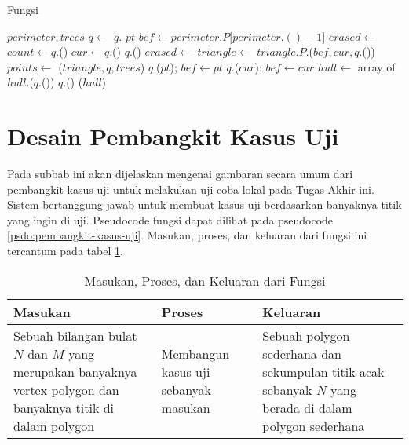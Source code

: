 \begin{algorithm}
    \caption{Fungsi }
	\label{psdo:fungsi-solve}
    \begin{algorithmic}[1]
        \Require $perimeter, trees$
        \State $q \leftarrow$ 
        \State $q.$ $pt$
		\EndFor
		\State $bef \leftarrow perimeter.P[perimeter.$$()-1]$
			\State $erased \leftarrow$ 
			\State $count \leftarrow q.$()
				\State $cur \leftarrow q.$()
				$q.$()
					\State $erased \leftarrow$ 
					\State $triangle \leftarrow$ 
					\State $triangle.P.$($bef, cur, q.$())
					\State $points \leftarrow$ ($triangle,q,trees$)
						\State $q.$($pt$);
						$bef \leftarrow pt$
					\EndFor
				\Else
					\State $q.$($cur$);
					$bef \leftarrow cur$
				\EndIf
			\EndWhile
			\EndIf
		\EndWhile  
		\State $hull \leftarrow$ array of 
			\State $hull.$($q.$())
			\State $q.$()
		\EndWhile
		\State \Return {}($hull$)
	\end{algorithmic}
\end{algorithm}

\newpage
\section{ Desain Pembangkit Kasus Uji}
\label{sec:pembangkit-kasus-uji}
Pada subbab ini akan dijelaskan mengenai gambaran secara umum dari pembangkit kasus uji untuk melakukan uji coba lokal pada Tugas Akhir ini.
Sistem  bertanggung jawab untuk membuat kasus uji berdasarkan banyaknya titik yang ingin di uji. Pseudocode fungsi  dapat dilihat pada pseudocode \ref{psdo:pembangkit-kasus-uji}. Masukan, proses, dan keluaran dari fungsi ini tercantum pada tabel \ref{tab:pembangkit-kasus-uji}.
\begin{table}[htb]
	\Centering
	\caption{Masukan, Proses, dan Keluaran dari Fungsi  }
	\begin{tabular}{|p{3cm}|p{3cm}|p{3cm}|}
	\hline
	Masukan   & Proses     & Keluaran \\ \hline
	Sebuah bilangan bulat $N$ dan $M$ yang merupakan banyaknya vertex polygon dan banyaknya titik di dalam polygon & Membangun kasus uji sebanyak masukan  &   Sebuah polygon sederhana dan sekumpulan titik acak sebanyak $N$ yang berada di dalam polygon sederhana\\ \hline
	\end{tabular}
	\label{tab:pembangkit-kasus-uji}
\end{table}


